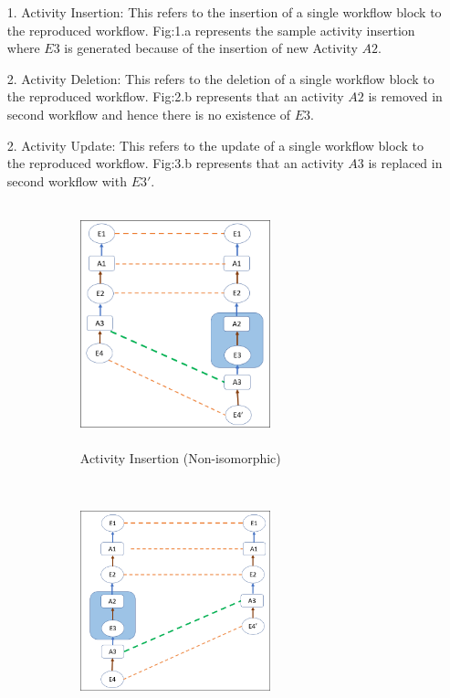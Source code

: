 \documentclass[10pt,conference,twocolumn]{IEEEtran}
\begin{document}
\begin{enumerate} \label{data}
\item[1.] Activity Insertion:
This refers to the insertion of a single workflow block to the reproduced workflow. Fig:1.a represents the sample activity insertion where $E3$ is generated because of the insertion of new Activity $A2$. 
\item[2.] Activity Deletion:
This refers to the deletion of a single workflow block to the reproduced workflow. Fig:2.b represents that an activity $A2$ is removed in second workflow and hence there is no existence of $E3$.
\item[2.] Activity Update:
This refers to the update of a single workflow block to the reproduced workflow. Fig:3.b represents that an activity $A3$ is replaced in second workflow with $E3'$.
\begin{figure}
\centering
\begin{subfigure}{.33\textwidth}
  \centering
  \includegraphics[width=5.5cm,height=7cm]{ActivityInsertion.png}
  \caption{Activity Insertion (Non-isomorphic)}
\label{fig: Activity Insertion}
\end{subfigure}%
\begin{subfigure}{.33\textwidth}
  \centering
   \includegraphics[width=5.5cm,height=7cm]{ActivityDeletion.png}

\end{subfigure}
\end{figure}
\end{enumerate}
\end{document}
